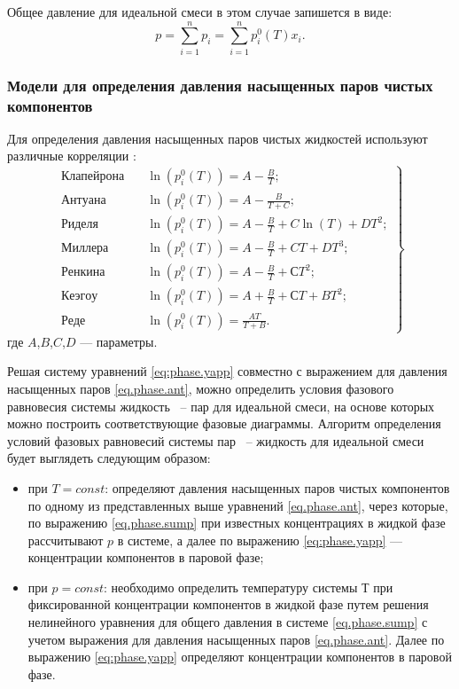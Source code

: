 Общее давление для идеальной смеси в этом случае запишется в виде:
\begin{equation}\label{eq.phase.sump}
	p=\sum\limits_{i=1}^{n} p_i=  \sum\limits_{i=1}^{n} p_i^0 (T) x_i.
\end{equation}

\subsubsection{Модели для определения давления насыщенных паров чистых компонентов}


Для определения давления насыщенных паров чистых жидкостей используют различные корреляции \cite{yelles1989,rid1982}:
\begin{equation} \label{eq.phase.ant}
\left.
\begin{aligned} 
\text{Клапейрона} &\quad \ln(p_i^0(T))=A-\frac{B}{T};\\ 
Антуана &\quad \ln(p_i^0(T))=A-\frac{B}{T+C};\\ 
Риделя &\quad \ln(p_i^0(T))=A-\frac{B}{T}+C \ln(T)+D T^2;\\ 
Миллера &\quad \ln(p_i^0(T))=A-\frac{B}{T}+C T+D T^3;\\ 
Ренкина &\quad \ln(p_i^0(T))=A-\frac{B}{T}+С T^2;\\ 
Кеэгоу &\quad \ln(p_i^0(T))=A+\frac{B}{T}+С T+BT^2;\\ 
Реде &\quad \ln(p_i^0(T))=\frac{AT}{T+B}.
\end{aligned} 
\right\rbrace
\end{equation}
где $A$,$B$,$C$,$D$ --- параметры.

Решая систему уравнений \eqref{eq:phase.yapp} совместно с выражением для давления насыщенных паров \eqref{eq.phase.ant}, можно определить условия фазового равновесия системы жидкость ~-- пар для идеальной смеси, на основе которых можно построить соответствующие фазовые диаграммы. 
Алгоритм определения условий фазовых равновесий системы пар ~-- жидкость для идеальной смеси будет выглядеть следующим образом:
\begin{itemize}
	\item при $T = const$: определяют давления насыщенных паров чистых компонентов по одному из представленных выше уравнений \eqref{eq.phase.ant}, через которые, по выражению \eqref{eq.phase.sump} при известных концентрациях в жидкой фазе рассчитывают  $p$ в системе, а далее по выражению  \eqref{eq:phase.yapp} --- концентрации компонентов в паровой фазе;
	\item при $p = const$: необходимо определить температуру системы $Т$ при фиксированной концентрации компонентов в жидкой фазе путем решения нелинейного уравнения для общего давления в системе \eqref{eq.phase.sump} с учетом выражения для давления насыщенных паров \eqref{eq.phase.ant}. Далее по выражению \eqref{eq:phase.yapp} определяют концентрации компонентов в паровой фазе.
\end{itemize}

